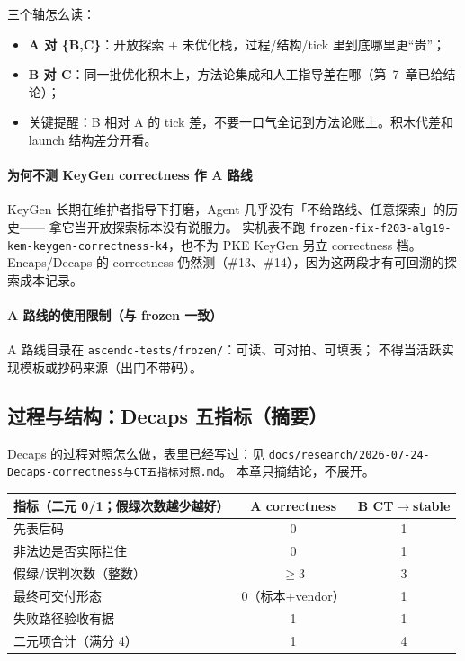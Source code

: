 \documentclass[UTF8,a4paper,11pt]{ctexart}
\theoremstyle{definition}
\theoremstyle{plain}
\theoremstyle{remark}
\numberwithin{figure}{section}
\numberwithin{table}{section}
\begin{document}
\noindent 三个轴怎么读：
\begin{itemize}
  \item \textbf{A 对 \{B,C\}}：开放探索 + 未优化栈，过程/结构/tick 里到底哪里更“贵”；
  \item \textbf{B 对 C}：同一批优化积木上，方法论集成和人工指导差在哪（第~7~章已给结论）；
  \item 关键提醒：B 相对 A 的 tick 差，不要一口气全记到方法论账上。积木代差和 launch 结构差分开看。
\end{itemize}

\paragraph{为何不测 KeyGen correctness 作 A 路线}
KeyGen 长期在维护者指导下打磨，Agent 几乎没有「不给路线、任意探索」的历史——
拿它当开放探索标本没有说服力。
实机表不跑 \texttt{frozen-fix-f203-alg19-kem-keygen-correctness-k4}，也不为 PKE KeyGen 另立 correctness 档。
Encaps/Decaps 的 correctness 仍然测（\#13、\#14），因为这两段才有可回溯的探索成本记录。

\paragraph{A 路线的使用限制（与 frozen 一致）}
A 路线目录在 \texttt{ascendc-tests/frozen/}：可读、可对拍、可填表；
不得当活跃实现模板或抄码来源（出门不带码）。

\subsection{过程与结构：Decaps 五指标（摘要）}
\label{sec:ch9-five-metrics}

Decaps 的过程对照怎么做，表里已经写过：见 \texttt{docs/research/2026-07-24-Decaps-correctness与CT五指标对照.md}。
本章只摘结论，不展开。

\begin{center}
\small
\begin{tabular}{@{}L{4.5cm}cc@{}}
  \toprule
  指标（二元 0/1；假绿次数越少越好） & A correctness & B CT$\to$stable \\
  \midrule
  先表后码 & 0 & 1 \\
  非法边是否实际拦住 & 0 & 1 \\
  假绿/误判次数（整数） & $\geq 3$ & 3 \\
  最终可交付形态 & 0（标本+vendor） & 1 \\
  失败路径验收有据 & 1 & 1 \\
  \midrule
  二元项合计（满分 4） & 1 & 4 \\
  \bottomrule
\end{tabular}
\end{center}
\end{document}
